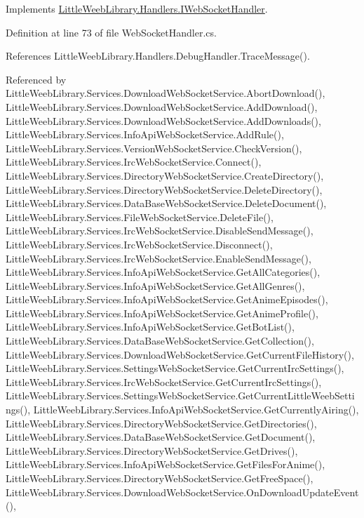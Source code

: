 Implements \mbox{\hyperlink{interface_little_weeb_library_1_1_handlers_1_1_i_web_socket_handler_a1e512d10e0dd5f5b15abc2b46659142a}{Little\+Weeb\+Library.\+Handlers.\+I\+Web\+Socket\+Handler}}.



Definition at line 73 of file Web\+Socket\+Handler.\+cs.



References Little\+Weeb\+Library.\+Handlers.\+Debug\+Handler.\+Trace\+Message().



Referenced by Little\+Weeb\+Library.\+Services.\+Download\+Web\+Socket\+Service.\+Abort\+Download(), Little\+Weeb\+Library.\+Services.\+Download\+Web\+Socket\+Service.\+Add\+Download(), Little\+Weeb\+Library.\+Services.\+Download\+Web\+Socket\+Service.\+Add\+Downloads(), Little\+Weeb\+Library.\+Services.\+Info\+Api\+Web\+Socket\+Service.\+Add\+Rule(), Little\+Weeb\+Library.\+Services.\+Version\+Web\+Socket\+Service.\+Check\+Version(), Little\+Weeb\+Library.\+Services.\+Irc\+Web\+Socket\+Service.\+Connect(), Little\+Weeb\+Library.\+Services.\+Directory\+Web\+Socket\+Service.\+Create\+Directory(), Little\+Weeb\+Library.\+Services.\+Directory\+Web\+Socket\+Service.\+Delete\+Directory(), Little\+Weeb\+Library.\+Services.\+Data\+Base\+Web\+Socket\+Service.\+Delete\+Document(), Little\+Weeb\+Library.\+Services.\+File\+Web\+Socket\+Service.\+Delete\+File(), Little\+Weeb\+Library.\+Services.\+Irc\+Web\+Socket\+Service.\+Disable\+Send\+Message(), Little\+Weeb\+Library.\+Services.\+Irc\+Web\+Socket\+Service.\+Disconnect(), Little\+Weeb\+Library.\+Services.\+Irc\+Web\+Socket\+Service.\+Enable\+Send\+Message(), Little\+Weeb\+Library.\+Services.\+Info\+Api\+Web\+Socket\+Service.\+Get\+All\+Categories(), Little\+Weeb\+Library.\+Services.\+Info\+Api\+Web\+Socket\+Service.\+Get\+All\+Genres(), Little\+Weeb\+Library.\+Services.\+Info\+Api\+Web\+Socket\+Service.\+Get\+Anime\+Episodes(), Little\+Weeb\+Library.\+Services.\+Info\+Api\+Web\+Socket\+Service.\+Get\+Anime\+Profile(), Little\+Weeb\+Library.\+Services.\+Info\+Api\+Web\+Socket\+Service.\+Get\+Bot\+List(), Little\+Weeb\+Library.\+Services.\+Data\+Base\+Web\+Socket\+Service.\+Get\+Collection(), Little\+Weeb\+Library.\+Services.\+Download\+Web\+Socket\+Service.\+Get\+Current\+File\+History(), Little\+Weeb\+Library.\+Services.\+Settings\+Web\+Socket\+Service.\+Get\+Current\+Irc\+Settings(), Little\+Weeb\+Library.\+Services.\+Irc\+Web\+Socket\+Service.\+Get\+Current\+Irc\+Settings(), Little\+Weeb\+Library.\+Services.\+Settings\+Web\+Socket\+Service.\+Get\+Current\+Little\+Weeb\+Settings(), Little\+Weeb\+Library.\+Services.\+Info\+Api\+Web\+Socket\+Service.\+Get\+Currently\+Airing(), Little\+Weeb\+Library.\+Services.\+Directory\+Web\+Socket\+Service.\+Get\+Directories(), Little\+Weeb\+Library.\+Services.\+Data\+Base\+Web\+Socket\+Service.\+Get\+Document(), Little\+Weeb\+Library.\+Services.\+Directory\+Web\+Socket\+Service.\+Get\+Drives(), Little\+Weeb\+Library.\+Services.\+Info\+Api\+Web\+Socket\+Service.\+Get\+Files\+For\+Anime(), Little\+Weeb\+Library.\+Services.\+Directory\+Web\+Socket\+Service.\+Get\+Free\+Space(), Little\+Weeb\+Library.\+Services.\+Download\+Web\+Socket\+Service.\+On\+Download\+Update\+Event(), 